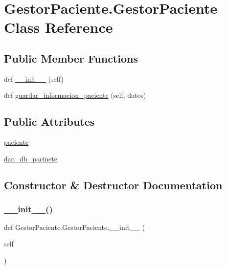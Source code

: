 \hypertarget{class_gestor_paciente_1_1_gestor_paciente}{}\section{Gestor\+Paciente.\+Gestor\+Paciente Class Reference}
\label{class_gestor_paciente_1_1_gestor_paciente}
\subsection*{Public Member Functions}
\begin{DoxyCompactItemize}
\item 
def \mbox{\hyperlink{class_gestor_paciente_1_1_gestor_paciente_a2950c017c2b347572c1fb0d203c3d995}{\+\_\+\+\_\+init\+\_\+\+\_\+}} (self)
\item 
def \mbox{\hyperlink{class_gestor_paciente_1_1_gestor_paciente_aa67ac548d627bedc213c3eb39b051bb9}{guardar\+\_\+informacion\+\_\+paciente}} (self, datos)
\end{DoxyCompactItemize}
\subsection*{Public Attributes}
\begin{DoxyCompactItemize}
\item 
\mbox{\hyperlink{class_gestor_paciente_1_1_gestor_paciente_a99f4445d5dc336acbb8df1c8c273a019}{paciente}}
\item 
\mbox{\hyperlink{class_gestor_paciente_1_1_gestor_paciente_af985b307324e1ed89c05c771af5cd30f}{dao\+\_\+db\+\_\+pacinete}}
\end{DoxyCompactItemize}


\subsection{Constructor \& Destructor Documentation}
\mbox{\label{class_gestor_paciente_1_1_gestor_paciente_a2950c017c2b347572c1fb0d203c3d995}} 
\subsubsection{\texorpdfstring{\+\_\+\+\_\+init\+\_\+\+\_\+()}{\_\_init\_\_()}}
{\footnotesize\ttfamily def Gestor\+Paciente.\+Gestor\+Paciente.\+\_\+\+\_\+init\+\_\+\+\_\+ (\begin{DoxyParamCaption}\item[{}]{self }\end{DoxyParamCaption})}



